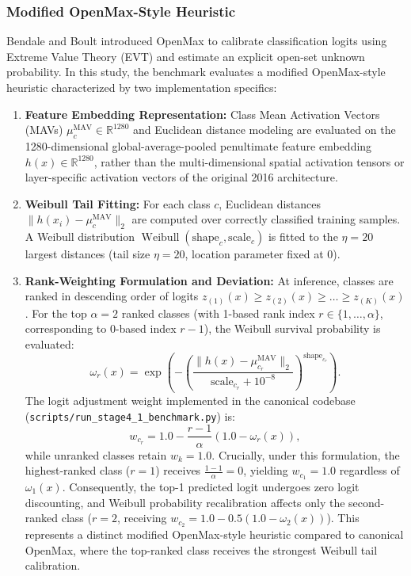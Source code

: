 \subsubsection{Modified OpenMax-Style Heuristic}
Bendale and Boult \cite{bendale2016towards} introduced OpenMax to calibrate classification logits using Extreme Value Theory (EVT) and estimate an explicit open-set unknown probability. In this study, the benchmark evaluates a modified OpenMax-style heuristic characterized by two implementation specifics:
\begin{enumerate}
\item \textbf{Feature Embedding Representation:} Class Mean Activation Vectors (MAVs) $\mu_c^{\text{MAV}} \in \mathbb{R}^{1280}$ and Euclidean distance modeling are evaluated on the 1280-dimensional global-average-pooled penultimate feature embedding $h(x) \in \mathbb{R}^{1280}$, rather than the multi-dimensional spatial activation tensors or layer-specific activation vectors of the original 2016 architecture.
\item \textbf{Weibull Tail Fitting:} For each class $c$, Euclidean distances $\|h(x_i) - \mu_c^{\text{MAV}}\|_2$ are computed over correctly classified training samples. A Weibull distribution $\operatorname{Weibull}(\text{shape}_c, \text{scale}_c)$ is fitted to the $\eta = 20$ largest distances (tail size $\eta = 20$, location parameter fixed at 0).
\item \textbf{Rank-Weighting Formulation and Deviation:} At inference, classes are ranked in descending order of logits $z_{(1)}(x) \ge z_{(2)}(x) \ge \dots \ge z_{(K)}(x)$. For the top $\alpha = 2$ ranked classes (with 1-based rank index $r \in \{1, \dots, \alpha\}$, corresponding to 0-based index $r-1$), the Weibull survival probability is evaluated:
\begin{equation}
\omega_r(x) = \exp\left( - \left( \frac{\|h(x) - \mu_{c_r}^{\text{MAV}}\|_2}{\text{scale}_{c_r} + 10^{-8}} \right)^{\text{shape}_{c_r}} \right).
\end{equation}
The logit adjustment weight implemented in the canonical codebase ({\small\nolinkurl{scripts/run_stage4_1_benchmark.py}}) is:
\begin{equation}
w_{c_r} = 1.0 - \frac{r - 1}{\alpha} (1.0 - \omega_r(x)),
\end{equation}
while unranked classes retain $w_k = 1.0$. Crucially, under this formulation, the highest-ranked class ($r = 1$) receives $\frac{1 - 1}{\alpha} = 0$, yielding $w_{c_1} = 1.0$ regardless of $\omega_1(x)$. Consequently, the top-1 predicted logit undergoes zero logit discounting, and Weibull probability recalibration affects only the second-ranked class ($r = 2$, receiving $w_{c_2} = 1.0 - 0.5(1.0 - \omega_2(x))$). This represents a distinct modified OpenMax-style heuristic compared to canonical OpenMax, where the top-ranked class receives the strongest Weibull tail calibration.

\end{enumerate}

